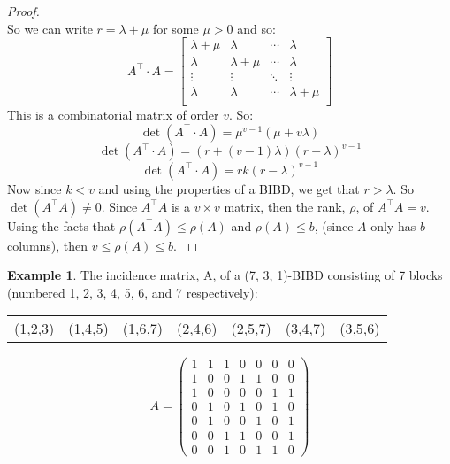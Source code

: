 \documentclass[12pt]{article}
\theoremstyle{definition}
\newtheorem{ex}[thm]{Example}
\begin{document}
\begin{proof}
\begin{equation*}
\end{equation*}
So we can write $r = \lambda + \mu$ for some $\mu>0$ and so:
\begin{equation}
A^\intercal \cdot A = \begin{bmatrix} 
\lambda + \mu & \lambda & \cdots & \lambda \\
\lambda & \lambda + \mu & \cdots & \lambda \\
\vdots & \vdots & \ddots & \vdots \\
\lambda & \lambda & \cdots & \lambda + \mu \\
\end{bmatrix}
\end{equation}
This is a combinatorial matrix of order $v$.
So: 
\begin{equation}
\displaystyle \det \left({A^\intercal \cdot A}\right) = \displaystyle \mu^{v-1} \left ({\mu + v \lambda}\right)
\end{equation}
\begin{equation}
\displaystyle \det \left({A^\intercal \cdot A}\right) = \displaystyle \left ({r + \left({v-1}\right) \lambda}\right) \left({r - \lambda}\right)^{v-1}
\end{equation}
\begin{equation}
\displaystyle \det \left({A^\intercal \cdot A}\right) = \displaystyle r k \left({r - \lambda}\right)^{v-1}
\end{equation}
Now since $k < v$ and using the properties of a BIBD, we get that $r > \lambda$. So $\det \left({A^\intercal A}\right) \ne 0$. Since $A^\intercal A$ is a $v\times{v}$ matrix, then the rank, $\rho$, of $A^\intercal A = v$.
Using the facts that $\rho \left({A^\intercal A}\right) \le \rho \left({A}\right)$ and $\rho \left({A}\right) \le b$, (since $A$ only has $b$ columns), then $v \le \rho \left({A}\right) \le b$. \cite{FisherInequality}
\end{proof}
\begin{ex}\label{incidence-matrix}
The incidence matrix, A, of a (7, 3, 1)-BIBD consisting of 7 blocks (numbered 1, 2, 3, 4, 5, 6, and 7 respectively):
\begin{center}
\begin{tabular}{lllllll} 
(1,2,3) & (1,4,5) & (1,6,7) & (2,4,6) & (2,5,7) &  (3,4,7) & (3,5,6) \\
\end{tabular}
\end{center}
\[A = \left( \begin{array}{ccccccc}
1 & 1 & 1 & 0 & 0 & 0 & 0 \\
1 & 0 & 0 & 1 & 1 & 0 & 0 \\
1 & 0 & 0 & 0 & 0 & 1 & 1 \\
0 & 1 & 0 & 1 & 0 & 1 & 0 \\
0 & 1 & 0 & 0 & 1 & 0 & 1 \\
0 & 0 & 1 & 1 & 0 & 0 & 1 \\
0 & 0 & 1 & 0 & 1 & 1 & 0 \end{array} \right)\]
\end{ex}
\end{document}
